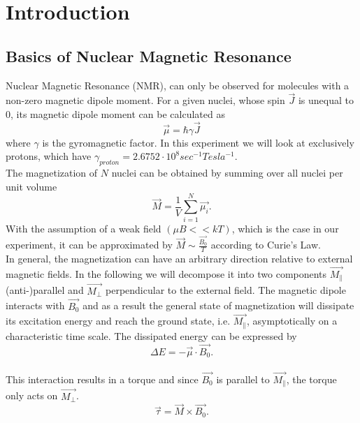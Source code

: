 \section{Introduction}\label{intro}
\subsection{Basics of Nuclear Magnetic Resonance}\label{basics}
Nuclear Magnetic Resonance (NMR), can only be observed for molecules with a non-zero magnetic dipole moment. For a given nuclei, whose spin $\vec{J}$ is unequal to 0, its magnetic dipole moment can be calculated as
\begin{equation}
	\label{1}
	\vec{\mu} = \hbar \gamma \vec{J}
\end{equation}
where $\gamma$ is the gyromagnetic factor. In this experiment we will look at exclusively protons, which have $\gamma_{proton} = 2.6752 \cdot 10^8 sec^{-1} Tesla^{-1}$.
\vspace{3mm} \\
The magnetization of $N$ nuclei can be obtained by summing over all nuclei per unit volume
\begin{equation}
	\label{2}
	\vec{M} = \dfrac{1}{V} \sum^{N}_{i=1} \vec{\mu_i}.
\end{equation}
With the assumption of a weak field $(\mu B << kT)$, which is the case in our experiment, it can be approximated by $\vec{M} \sim \frac{\vec{B_{0}}}{T}$ according to Curie's Law. 
\vspace{5mm} \\
In general, the magnetization can have an arbitrary direction relative to external magnetic fields. In the following we will decompose it into two components $\vec{M_{\parallel}}$ (anti-)parallel and $\vec{M_{\perp}}$ perpendicular to the external field. 
The magnetic dipole interacts with $\vec{B_{0}}$ and as a result the general state of magnetization will dissipate its excitation energy and reach the ground state, i.e. $\vec{M_{\parallel}}$, asymptotically on a characteristic time scale. The dissipated energy can be expressed by
\begin{equation}
	\label{5}
	\Delta E = - \vec{\mu} \cdot \vec{B_0}.
\end{equation}
\vspace{3mm} \\
This interaction results in a torque and since $\vec{B_{0}}$ is parallel to $\vec{M_{\parallel}}$, the torque only acts on $\vec{M_{\perp}}$.
\begin{equation}
	\label{6}
	\vec{\tau} = \vec{M} \times \vec{B_{0}}.
\end{equation}
